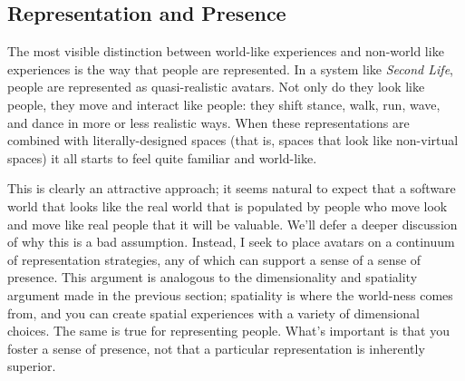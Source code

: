 
\subsection{Representation and Presence}


The most visible distinction between world-like experiences and non-world like experiences is the way that people are represented. In a system like \emph{Second Life}, people are represented as quasi-realistic avatars. Not only do they look like people, they move and interact like people: they shift stance, walk, run, wave, and dance in more or less realistic ways. When these representations are combined with literally-designed spaces (that is, spaces that look like non-virtual spaces) it all starts to feel quite familiar and world-like.

This is clearly an attractive approach; it seems natural to expect that a software world that looks like the real world that is populated by people who move look and move like real people that it will be valuable. We'll defer a deeper discussion of why this is a bad assumption. Instead, I seek to place avatars on a continuum of representation strategies, any of which can support a sense of a sense of presence. This argument is analogous to the dimensionality and spatiality argument made in the previous section; spatiality is where the world-ness comes from, and you can create spatial experiences with a variety of dimensional choices. The same is true for representing people. What's important is that you foster a sense of presence, not that a particular representation is inherently superior.


